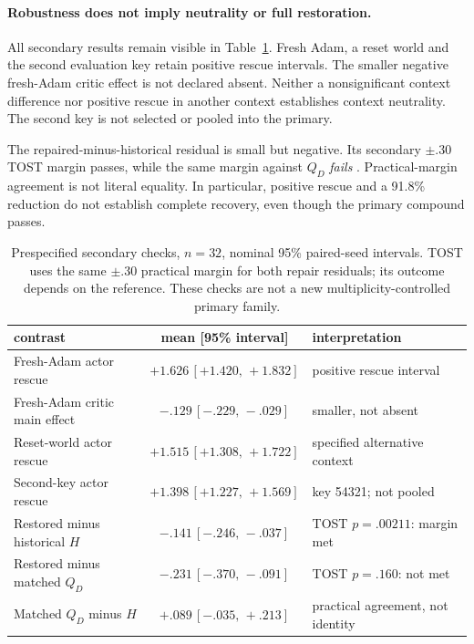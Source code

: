 \documentclass[10pt]{article}
\newcommand{\ci}[2]{\,[#1,\,#2]}
\begin{document}
\paragraph{Robustness does not imply neutrality or full restoration.}
All secondary results remain visible in Table~\ref{m:secondary}. Fresh Adam, a reset world and the second evaluation key retain positive rescue intervals. The smaller negative fresh-Adam critic effect is not declared absent. Neither a nonsignificant context difference nor positive rescue in another context establishes context neutrality. The second key is not selected or pooled into the primary.

The repaired-minus-historical residual is small but negative. Its secondary $\pm.30$ TOST margin passes, while the same margin against $Q_D$ \emph{fails} \citep{lakens2017equivalence}. Practical-margin agreement is not literal equality. In particular, positive rescue and a 91.8\% reduction do not establish complete recovery, even though the primary compound passes.

\begin{table}[t]
\centering
\caption{Prespecified secondary checks, $n=32$, nominal 95\% paired-seed intervals. TOST uses the same $\pm.30$ practical margin for both repair residuals; its outcome depends on the reference. These checks are not a new multiplicity-controlled primary family.}
\label{m:secondary}
\small
\begin{tabularx}{\linewidth}{@{}Xcl@{}}
\toprule
contrast & mean [95\% interval] & interpretation \\
\midrule
Fresh-Adam actor rescue & $+1.626\ci{+1.420}{+1.832}$ & positive rescue interval \\
Fresh-Adam critic main effect & $-.129\ci{-.229}{-.029}$ & smaller, not absent \\
Reset-world actor rescue & $+1.515\ci{+1.308}{+1.722}$ & specified alternative context \\
Second-key actor rescue & $+1.398\ci{+1.227}{+1.569}$ & key 54321; not pooled \\
Restored minus historical $H$ & $-.141\ci{-.246}{-.037}$ & TOST $p=.00211$: margin met \\
Restored minus matched $Q_D$ & $-.231\ci{-.370}{-.091}$ & TOST $p=.160$: not met \\
Matched $Q_D$ minus $H$ & $+.089\ci{-.035}{+.213}$ & practical agreement, not identity \\
\bottomrule
\end{tabularx}
\end{table}
\end{document}
